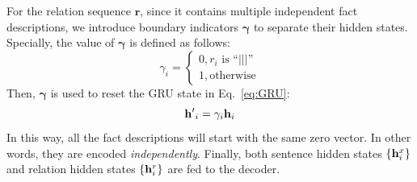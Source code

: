 \documentclass[letterpaper]{article} %
\begin{document}
	For the relation sequence $\mathbf{r}$, since it contains multiple independent fact descriptions, we introduce boundary indicators $\mathbf{\gamma}$ to separate their hidden states.
	Specially, the value of $\mathbf{\gamma}$ is defined as follows:
	\begin{equation} \label{eq:0_1}
		{\gamma _i} = \left\{ {\begin{array}{*{20}{l}}
				{0,{r_i} \text{ is ``$|||$''}}\\
				{1,\text{otherwise}}
		\end{array}} \right.
	\end{equation}
	Then, ${\mathbf{\gamma}}$ is used to reset the GRU state in Eq.~\ref{eq:GRU}:
	\begin{equation} \label{eq:reset}
		{\bf{h'}}_i = {\gamma _i}{{\bf{h}}_i}
	\end{equation}
	In this way, all the fact descriptions will start with the same zero vector.
	In other words, they are encoded \textit{independently}.
	Finally, both sentence hidden states $\{ {\bf{h}}_i^x\} $ and relation hidden states $\{ {\bf{h}}_i^r\} $ are fed to the decoder. 
	
\end{document}
